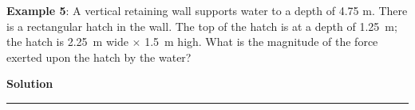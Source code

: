 \documentclass[10pt,onesided]{amsart}
\begin{document}
\begin{minipage}[t]{0.45\textwidth}
	\raggedright
	\textbf{Example 5}:
	\parb
	A vertical retaining wall supports water to a depth of 4.75 m. There
	is a rectangular hatch in the wall. The top of the hatch is at a depth of 1.25~m; the hatch is 2.25~m wide
	$\times$ 1.5~m high.
	\parb
	What is the magnitude of the force exerted upon the hatch by the water?
\end{minipage}
\hfill
\begin{minipage}[t]{0.5\textwidth}
	\textbf{Solution }
\end{minipage}
\parb
\rule{\textwidth}{0.02in}

\end{document}
